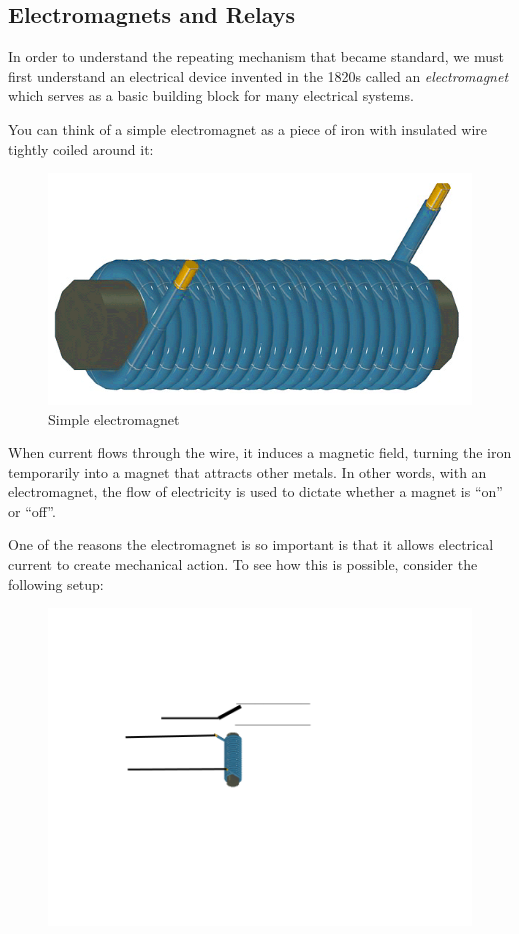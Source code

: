 \documentclass[UTF8]{book}
\begin{document}
\begin{CJK}{UTF8}{gbsn}
\section{Electromagnets and Relays}

In order to understand the repeating mechanism that became standard, we must first understand an electrical device invented in the 1820s called an \emph{electromagnet} which serves as a basic building block for many electrical systems.

You can think of a simple electromagnet as a piece of iron with insulated wire tightly coiled around it:

\begin{figure}[H]
\centering
\includegraphics[width=0.8\linewidth]{electromagnet}
\caption{Simple electromagnet}
\end{figure}

When current flows through the wire, it induces a magnetic field, turning the iron temporarily into a magnet that attracts other metals. In other words, with an electromagnet, the flow of electricity is used to dictate whether a magnet is ``on'' or ``off''.

One of the reasons the electromagnet is so important is that it allows electrical current to create mechanical action. To see how this is possible, consider the following setup:

\begin{figure}[H]
\centering
\includegraphics[width=0.8\linewidth]{electromagnet_with_latch}
\end{figure}


\end{CJK}
\end{document}
